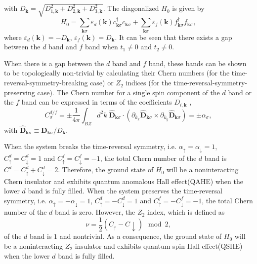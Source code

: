 \documentclass[amsmath,superscriptaddress,showpacs,aps,prb,twocolumn]{revtex4-1}
\begin{document}
with $D_{\mathbf{k}}=\sqrt{D^2_{1,\mathbf{k}}+D^2_{2,\mathbf{k}}+D^2_{3,\mathbf{k}}}$. The diagonalized $H_0$ is given by
\begin{equation}
H_{0}=\sum_{\mathbf{k}\sigma}\varepsilon_{d}(\mathbf{k})c^{\dagger}_{\mathbf{k}\sigma}c_{\mathbf{k}\sigma}
      +\sum_{\mathbf{k}\sigma}\varepsilon_{f}(\mathbf{k})f^{\dagger}_{\mathbf{k}\sigma}f_{\mathbf{k}\sigma},
\end{equation}
where $\varepsilon_{d}(\mathbf{k})=-D_{\mathbf{k}}$, $\varepsilon_{f}(\mathbf{k})=D_{\mathbf{k}}$. It can be seen that there exists a gap between the $d$ band and $f$ band when $t_1\ne0$ and $t_2\ne0$.
\par When there is a gap between the $d$ band and $f$ band, these bands can be shown to be topologically non-trivial by calculating their Chern numbers \cite{TKNN_PRL1982} (for the time-reversal-symmetry-breaking case) or $Z_2$ indices \cite{KM_PRL2005b,SWSH_PRL2006} (for the time-reversal-symmetry-preserving case). The Chern number for a single spin component of the $d$ band or the $f$ band can be expressed in terms of the coefficients $D_{i,\mathbf{k}}$ \cite{HK_RMP2010,QZ_RMP2011},
\begin{equation}
C_{\sigma}^{d/f}=\pm\frac{1}{4\pi}\int_{BZ}d^{2}k\;
    \hat{\mathbf{D}}_{\mathbf{k}\sigma}\cdot(\partial_{k_{x}}\hat{\mathbf{D}}_{\mathbf{k}\sigma}\times\partial_{k_{y}}\hat{\mathbf{D}}_{\mathbf{k}\sigma})
    =\pm\alpha_\sigma,
\end{equation}
with $\hat{\mathbf{D}}_{\mathbf{k}\sigma}\equiv\mathbf{D}_{\mathbf{k}\sigma}/D_{\mathbf{k}}$.
\par When the system breaks the time-reversal symmetry, i.e. $\alpha_\uparrow=\alpha_\downarrow=1$, $C_\uparrow^d=C_\downarrow^d=1$ and $C_\uparrow^f=C_\downarrow^f=-1$, the total Chern number of the $d$ band is $C^d=C_\uparrow^d+C_\downarrow^d=2$. Therefore, the ground state of $H_0$ will be a noninteracting Chern insulator and exhibits quantum anomalous Hall effect(QAHE) when the lower $d$ band is fully filled. When the system preserves the time-reversal symmetry, i.e. $\alpha_\uparrow=-\alpha_\downarrow=1$, $C_\uparrow^d=-C_\downarrow^d=1$ and $C_\uparrow^f=-C_\downarrow^f=-1$, the total Chern number of the $d$ band is zero. However, the $Z_2$ index, which is defined as
\begin{equation}
\nu=\frac{1}{2}(C_{\uparrow}-C{\downarrow})\mod2,
\end{equation}
of the $d$ band is $1$ and nontrivial. As a consequence, the ground state of $H_0$ will be a noninteracting $Z_2$ insulator and exhibits quantum spin Hall effect(QSHE) when the lower $d$ band is fully filled.
\end{document}

